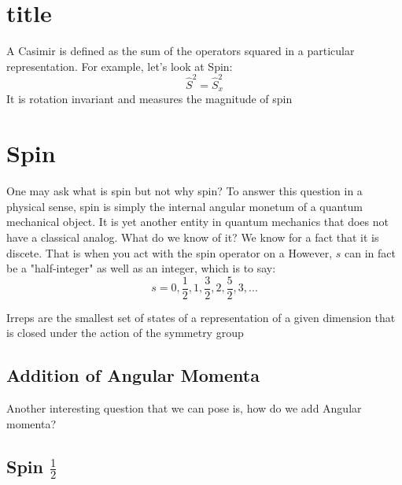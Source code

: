 \documentclass[]{article}
\begin{document}




\section{title}
A Casimir is defined as the sum of the operators squared in a particular representation. For example, let's look at Spin:
\begin{equation}
\hat{S}^{2} = \hat{S}_{x}^{2}
\end{equation}
It is rotation invariant and measures the magnitude of spin

\section{Spin}
One may ask what is spin but not why spin? To answer this question in a physical sense, spin is simply the internal angular monetum of a quantum mechanical object. It is yet another entity in quantum mechanics that does not have a classical analog. What do we know of it? We know for a fact that it is discete. That is when you act with the spin operator on a 
However, $s$ can in fact be a "half-integer" as well as an integer, which is to say:
$$s = 0, \frac{1}{2}, 1, \frac{3}{2}, 2, \frac{5}{2}, 3, ...$$

Irreps are
the smallest set of states of a representation of a given dimension that is
closed under the action of the symmetry group
\subsection{Addition of Angular Momenta}
Another interesting question that we can pose is, how do we add Angular momenta? 
\subsection{Spin $\frac{1}{2}$}
\end{document}
